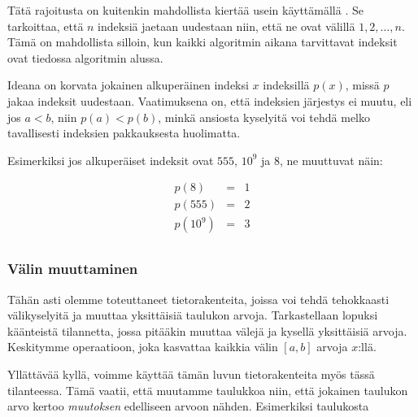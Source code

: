 
Tätä rajoitusta on kuitenkin mahdollista
kiertää usein käyttämällä .
Se tarkoittaa, että $n$ indeksiä jaetaan
uudestaan niin, että ne ovat välillä $1,2,\ldots,n$.
Tämä on mahdollista silloin, kun kaikki
algoritmin aikana tarvittavat indeksit
ovat tiedossa algoritmin alussa.

Ideana on korvata jokainen alkuperäinen
indeksi $x$ indeksillä $p(x)$,
missä $p$ jakaa indeksit uudestaan.
Vaatimuksena on, että indeksien järjestys
ei muutu, eli jos $a<b$, niin $p(a)<p(b)$,
minkä ansiosta kyselyitä voi tehdä
melko tavallisesti indeksien pakkauksesta huolimatta.

Esimerkiksi jos alkuperäiset indeksit ovat
$555$, $10^9$ ja $8$, ne muuttuvat näin:

\[
\begin{array}{lcl}
p(8) & = & 1 \\
p(555) & = & 2 \\
p(10^9) & = & 3 \\
\end{array}
\]

\subsubsection{Välin muuttaminen}

Tähän asti olemme toteuttaneet tietorakenteita,
joissa voi tehdä tehokkaasti välikyselyitä
ja muuttaa yksittäisiä taulukon arvoja.
Tarkastellaan lopuksi käänteistä tilannetta,
jossa pitääkin muuttaa välejä ja 
kysellä yksittäisiä arvoja.
Keskitymme operaatioon,
joka kasvattaa kaikkia välin $[a,b]$ arvoja $x$:llä.

Yllättävää kyllä,
voimme käyttää tämän luvun tietorakenteita myös tässä tilanteessa.
Tämä vaatii, että muutamme taulukkoa niin,
että jokainen taulukon arvo kertoo \textit{muutoksen}
edelliseen arvoon nähden.
Esimerkiksi taulukosta

